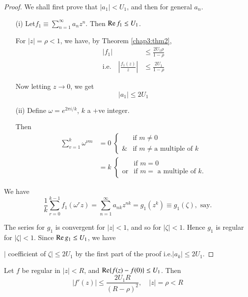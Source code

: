 \begin{proof}
We shall first prove that $|a_1| <U_1$, and then for general $a_n$.
\begin{itemize}
\item[(i)] Let\pageoriginale $f_1 \equiv \sum\limits^\infty_{n=1} a_n
  z^n$. Then $\operatorname{Re} f_1 \leq U_1$.

\eject

For $|z| = \rho < 1$, we have, by Theorem \ref{chap3:thm2}, 
\begin{align*}
|f_1| &\leq \frac{2U_1 \rho}{1-\rho}\\
\text{i.e.}\quad \left|\frac{f_1(z)}{z} \right| &\leq \frac{2U_1}{1-\rho}
\end{align*}

Now letting $z \to 0$, we get
$$
|a_1| \leq 2 U_1
$$

\item[(ii)] Define $\omega =e^{2\pi i/k}$, $k$ a $+$ve integer.

Then
\begin{align*}
\sum\limits^k_{v=1} \omega^{\nu m} & = 0\;
\begin{cases}
& \text{if } m \neq 0\\
\& & \text{if } m \neq \text{a multiple of $k$}
\end{cases}\\
& = k  \;
\begin{cases}
& \text{if } m =0\\
\text{or} & \text{if } m = \text{ a multiple of $k$}.
\end{cases}
\end{align*}
\end{itemize}

We have
$$
\frac{1}{k} \sum\limits^{k-1}_{r=0} f_1 (\omega^r z) =
\sum\limits^\infty_{n=1} a_{nk} z^{nk} = g_1 (z^k) \equiv g_1 (\zeta),
\text{ say}.
$$

The series for $g_1$ is convergent for $|z| <1$, and so for $|\zeta|
<1$. Hence $g_1$ is regular for $|\zeta|<1$. Since $\operatorname{Re} g_1 \leq
U_1$, we have

$|$ coefficient of $\zeta| \leq 2 U_1$ by the first part of the proof 
i.e.\pageoriginale $|a_k| \leq 2 U_1$.
\end{proof}

\setcounter{corollary}{0}
\begin{corollary}\label{chap3:coro1}
Let $f$ be regular in $|z| < R$, and $\operatorname{Re} \{f(z) -f(0)\} \leq
U_1$. Then
$$
|f'(z)| \leq \frac{2U_1 R}{(R -\rho)^2} , \quad |z| =\rho < R
$$
\end{corollary}

